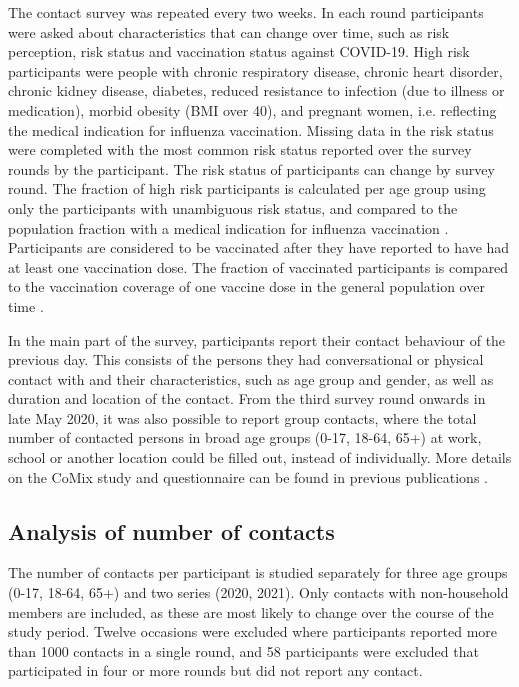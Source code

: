 \documentclass[fleqn,10pt]{wlscirep}
\begin{document}
The contact survey was repeated every two weeks. In each round participants were asked about characteristics that can change over time, such as risk perception, risk status and vaccination status against COVID-19. High risk participants were people with chronic respiratory disease, chronic heart disorder, chronic kidney disease, diabetes, reduced resistance to infection (due to illness or medication), morbid obesity (BMI over 40), and pregnant women, i.e. reflecting the medical indication for influenza vaccination. Missing data in the risk status were completed with the most common risk status reported over the survey rounds by the participant. The risk status of participants can change by survey round. The fraction of high risk participants is calculated per age group using only the participants with unambiguous risk status, and compared to the population fraction with a medical indication for influenza vaccination \cite{Nivel_2021}. Participants are considered to be vaccinated after they have reported to have had at least one vaccination dose. The fraction of vaccinated participants is compared to the vaccination coverage of one vaccine dose in the general population over time \cite{RIVM_2022}. 

In the main part of the survey, participants report their contact behaviour of the previous day. This consists of the persons they had conversational or physical contact with and their characteristics, such as age group and gender, as well as duration and location of the contact. From the third survey round onwards in late May 2020, it was also possible to report group contacts, where the total number of contacted persons in broad age groups (0-17, 18-64, 65+) at work, school or another location could be filled out, instead of individually. More details on the CoMix study and questionnaire can be found in previous publications \cite{Jarvis_2020, Verelst_2021, Gimma_2022}.


\subsection*{Analysis of number of contacts}

The number of contacts per participant is studied separately for three age groups (0-17, 18-64, 65+) and two series (2020, 2021). Only contacts with non-household members are included, as these are most likely to change over the course of the study period. Twelve occasions were excluded where participants reported more than 1000 contacts in a single round, and 58 participants were excluded that participated in four or more rounds but did not report any contact.
\end{document}
